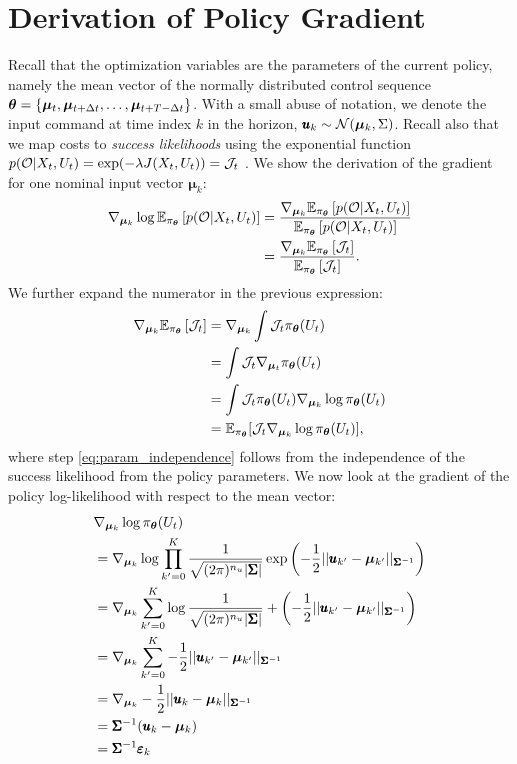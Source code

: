\section{Derivation of Policy Gradient}\label{sec:app_derivation_policy_gradient}
Recall that the optimization variables are the parameters of the current policy, namely the mean vector of the normally distributed control sequence $\boldsymbol{\theta} = \{\boldsymbol{\mu}_t,  \boldsymbol{\mu}_{t+\Delta t}, \dots, \boldsymbol{\mu}_{t+T-\Delta t} \}$. With a small abuse of notation, we denote the input command at time index $k$ in the horizon, $\pmb{u}_k \sim \mathcal{N}(\boldsymbol{\mu}_k, \Sigma)$. Recall also that we map costs to \emph{success likelihoods} using the exponential function $p(\mathcal{O} | X_t, U_t) = \exp(-\lambda J(X_t, U_t)) = \mathcal{J}_t$ . We show the derivation of the gradient for one nominal input vector $\boldsymbol{\mu}_k$:
\begin{align}
    \nabla_{\boldsymbol{\mu}_k} \log \mathbb{E}_{\pi_{\boldsymbol{\theta}}} \left [p(\mathcal{O} | X_t, U_t)\right]
    &= \frac{\nabla_{\boldsymbol{\mu}_k} \mathbb{E}_{\pi_{\boldsymbol{\theta}}} \left [p(\mathcal{O} | X_t, U_t)\right]}{\mathbb{E}_{\pi_{\boldsymbol{\theta}}} \left [p(\mathcal{O} | X_t, U_t)\right]} \\
    &= \frac{\nabla_{\boldsymbol{\mu}_k} \mathbb{E}_{\pi_{\boldsymbol{\theta}}} \left [\mathcal{J}_t\right]}{\mathbb{E}_{\pi_{\boldsymbol{\theta}}} \left [\mathcal{J}_t\right]}. \label{eq:log_gradient}
\end{align}
%
 We further expand the numerator in the previous expression:
\begin{align}
    \nabla_{\boldsymbol{\mu}_k} \mathbb{E}_{\pi_{\boldsymbol{\theta}}} \left [\mathcal{J}_t\right] 
    &= \nabla_{\boldsymbol{\mu}_k} \int \mathcal{J}_t \pi_{\boldsymbol{\theta}}(U_t) \label{eq:param_independence}\\
    &= \int \mathcal{J}_t \nabla_{\boldsymbol{\mu}_t} \pi_{\boldsymbol{\theta}}(U_t) \\
    &= \int \mathcal{J}_t \pi_{\boldsymbol{\theta}}(U_t) \nabla_{\boldsymbol{\mu}_k} \log \pi_{\boldsymbol{\theta}}(U_t) \\
    &= \mathbb{E}_{\pi_{\boldsymbol{\theta}}} [\mathcal{J}_t \nabla_{\boldsymbol{\mu}_k} \log \pi_{\boldsymbol{\theta}}(U_t)], \label{eq:almost_there}
\end{align}
where step \eqref{eq:param_independence} follows from the independence of the success likelihood from the policy parameters. We now look at the gradient of the policy log-likelihood with respect to the mean vector:
\begin{align}
    &\nabla_{\boldsymbol{\mu}_k} \log \pi_{\boldsymbol{\theta}}(U_t) \\
    &= \nabla_{\boldsymbol{\mu}_k} \log \prod_{k'=0}^{K} \frac{1}{\sqrt{(2\pi)^{n_u}|\pmb{\Sigma}|}}\exp\left(-\frac{1}{2}||\pmb{u}_{k'} - \boldsymbol{\mu}_{k'}||_{\pmb{\Sigma}^{-1}}\right) \\
    &= \nabla_{\boldsymbol{\mu}_k} \sum_{k'=0}^{K} \log \frac{1}{\sqrt{(2\pi)^{n_u}|\pmb{\Sigma}|}} + \left(-\frac{1}{2}||\pmb{u}_{k'} - \boldsymbol{\mu}_{k'}||_{\pmb{\Sigma}^{-1}}\right) \\
    &= \nabla_{\boldsymbol{\mu}_k} \sum_{k'=0}^{K} -\frac{1}{2}||\pmb{u}_{k'} - \boldsymbol{\mu}_{k'}||_{\pmb{\Sigma}^{-1}} \\
    &= \nabla_{\boldsymbol{\mu}_k} -\frac{1}{2}||\pmb{u}_k - \boldsymbol{\mu}_k||_{\pmb{\Sigma}^{-1}} \\
    &= \pmb{\Sigma}^{-1}(\pmb{u}_k - \boldsymbol{\mu}_k) \\
    &= \pmb{\Sigma}^{-1} \pmb{\varepsilon}_k
\end{align}
